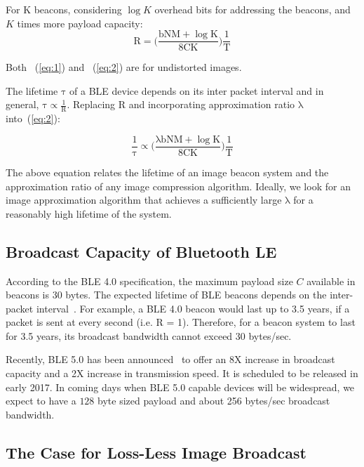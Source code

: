 For K beacons, considering $\log K$ overhead bits for addressing the beacons, and $K$ times more payload capacity:
\begin{equation}
	\mathrm{R = \bigg( \frac{bNM + \log K}{8CK} \bigg)  \frac{1}{T}}
	\label{eq:2}
\end{equation}

Both ~(\ref{eq:1}) and ~(\ref{eq:2}) are for undistorted images.



The lifetime $\mathrm{\tau}$ of a BLE device depends on its inter packet interval and in general, $\mathrm{\tau \propto \frac{1}{R}}$. Replacing $\mathrm{R}$ and incorporating approximation ratio $\mathrm{\lambda}$ into~(\ref{eq:2}):

\begin{equation}
	\mathrm{\frac{1}{\tau} \propto \bigg( \frac{\lambda bNM + \log K}{8CK} \bigg)  \frac{1}{T}}
	\label{eq:3}
\end{equation}

The above equation relates the lifetime of an image beacon system and the approximation ratio of any image compression algorithm. Ideally, we look for an image approximation algorithm that achieves a sufficiently large $\mathrm{\lambda}$ for a reasonably high lifetime of the system.



\subsection{Broadcast Capacity of Bluetooth LE}

According to the BLE 4.0 specification, the maximum payload size $C$ available in beacons is 30 bytes. The expected lifetime of BLE beacons depends on the inter-packet interval~\cite{dementyev2013power}. For example, a BLE 4.0 beacon would last up to 3.5 years, if a packet is sent at every second (i.e. R = 1). Therefore, for a beacon system to last for 3.5 years, its broadcast bandwidth cannot exceed 30 bytes/sec.

Recently, BLE 5.0 has been announced~\cite{BLE5} to offer an 8X increase in broadcast capacity and a 2X increase in transmission speed. It is scheduled to be released in early 2017. In coming days when BLE 5.0 capable devices will be widespread, we expect to have a $128$ byte sized payload and about 256 bytes/sec broadcast bandwidth.

\subsection{The Case for Loss-Less Image Broadcast}

